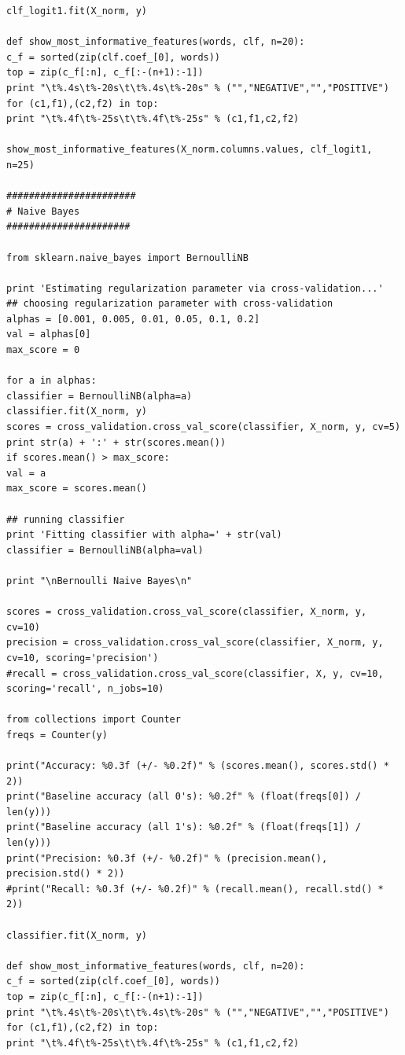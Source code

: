 \documentclass[12pt]{article}
\begin{document}
\begin{verbatim}
clf_logit1.fit(X_norm, y)

def show_most_informative_features(words, clf, n=20):
c_f = sorted(zip(clf.coef_[0], words))
top = zip(c_f[:n], c_f[:-(n+1):-1])
print "\t%.4s\t%-20s\t\t%.4s\t%-20s" % ("","NEGATIVE","","POSITIVE")
for (c1,f1),(c2,f2) in top:
print "\t%.4f\t%-25s\t\t%.4f\t%-25s" % (c1,f1,c2,f2)

show_most_informative_features(X_norm.columns.values, clf_logit1, n=25)

#######################
# Naive Bayes
######################

from sklearn.naive_bayes import BernoulliNB

print 'Estimating regularization parameter via cross-validation...'
## choosing regularization parameter with cross-validation
alphas = [0.001, 0.005, 0.01, 0.05, 0.1, 0.2]
val = alphas[0]
max_score = 0

for a in alphas:
classifier = BernoulliNB(alpha=a)
classifier.fit(X_norm, y)
scores = cross_validation.cross_val_score(classifier, X_norm, y, cv=5)
print str(a) + ':' + str(scores.mean())
if scores.mean() > max_score:
val = a
max_score = scores.mean()

## running classifier
print 'Fitting classifier with alpha=' + str(val)
classifier = BernoulliNB(alpha=val)

print "\nBernoulli Naive Bayes\n"

scores = cross_validation.cross_val_score(classifier, X_norm, y, cv=10)
precision = cross_validation.cross_val_score(classifier, X_norm, y, cv=10, scoring='precision')
#recall = cross_validation.cross_val_score(classifier, X, y, cv=10, scoring='recall', n_jobs=10)

from collections import Counter
freqs = Counter(y)

print("Accuracy: %0.3f (+/- %0.2f)" % (scores.mean(), scores.std() * 2))
print("Baseline accuracy (all 0's): %0.2f" % (float(freqs[0]) / len(y)))
print("Baseline accuracy (all 1's): %0.2f" % (float(freqs[1]) / len(y)))
print("Precision: %0.3f (+/- %0.2f)" % (precision.mean(), precision.std() * 2))
#print("Recall: %0.3f (+/- %0.2f)" % (recall.mean(), recall.std() * 2))

classifier.fit(X_norm, y)

def show_most_informative_features(words, clf, n=20):
c_f = sorted(zip(clf.coef_[0], words))
top = zip(c_f[:n], c_f[:-(n+1):-1])
print "\t%.4s\t%-20s\t\t%.4s\t%-20s" % ("","NEGATIVE","","POSITIVE")
for (c1,f1),(c2,f2) in top:
print "\t%.4f\t%-25s\t\t%.4f\t%-25s" % (c1,f1,c2,f2)


\end{verbatim}
\end{document}
